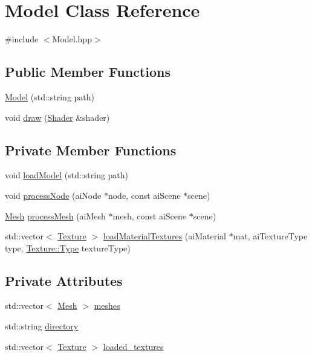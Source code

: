 \hypertarget{classModel}{}\section{Model Class Reference}
\label{classModel}


{\ttfamily \#include $<$Model.\+hpp$>$}

\subsection*{Public Member Functions}
\begin{DoxyCompactItemize}
\item 
\hyperlink{classModel_a54be740d1cd7d9e44b07b747d97940b5}{Model} (std\+::string path)
\item 
void \hyperlink{classModel_a5cd069fb85bb68b54c476bd799c4d8d7}{draw} (\hyperlink{classShader}{Shader} \&shader)
\end{DoxyCompactItemize}
\subsection*{Private Member Functions}
\begin{DoxyCompactItemize}
\item 
void \hyperlink{classModel_a3cd88224a93dc81a8503d42be807eb86}{load\+Model} (std\+::string path)
\item 
void \hyperlink{classModel_a23b167ce0d33f7e6ab5693cd5e81a9a5}{process\+Node} (ai\+Node $\ast$node, const ai\+Scene $\ast$scene)
\item 
\hyperlink{classMesh}{Mesh} \hyperlink{classModel_a95ae1a9980ded3d98b1c8785cb889d96}{process\+Mesh} (ai\+Mesh $\ast$mesh, const ai\+Scene $\ast$scene)
\item 
std\+::vector$<$ \hyperlink{classTexture}{Texture} $>$ \hyperlink{classModel_af0718330b26c1f99262f40628ae12341}{load\+Material\+Textures} (ai\+Material $\ast$mat, ai\+Texture\+Type type, \hyperlink{classTexture_a9d0b09cfb795f9553db6a4eab396bef9}{Texture\+::\+Type} texture\+Type)
\end{DoxyCompactItemize}
\subsection*{Private Attributes}
\begin{DoxyCompactItemize}
\item 
std\+::vector$<$ \hyperlink{classMesh}{Mesh} $>$ \hyperlink{classModel_a538e42901dcfba59471072a48a162163}{meshes}
\item 
std\+::string \hyperlink{classModel_a5ea3aa111c7a7d179e93dcc0bb567701}{directory}
\item 
std\+::vector$<$ \hyperlink{classTexture}{Texture} $>$ \hyperlink{classModel_a6b63a4363bd6bd2e977b0c022ee7e772}{loaded\+\_\+textures}
\end{DoxyCompactItemize}


